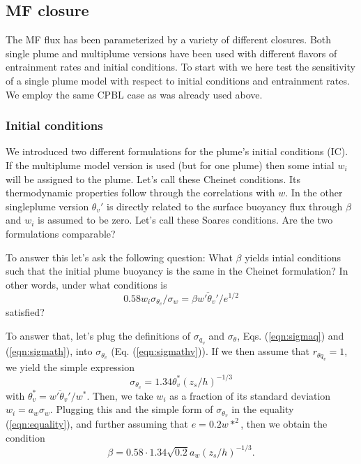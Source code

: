 \documentclass[dvipdfmx,a4paper,10pt]{article}
\begin{document}
\subsection{MF closure}

The MF flux has been parameterized by a variety of different closures. Both single plume and multiplume versions have been used with different flavors of entrainment rates and initial conditions. To start with we here test the sensitivity of a single plume model with respect to initial conditions and entrainment rates. We employ the same CPBL case \citep{nieuwstadt93,witek11} as was already used above.

\subsubsection{Initial conditions}

We introduced two different formulations for the plume's initial conditions (IC). If the multiplume model version is used (but for one plume) then some intial $w_i$ will be assigned to the plume. Let's call these Cheinet conditions. Its thermodynamic properties follow through the correlations with $w$. In the other singleplume version $\theta_v'$ is directly related to the surface buoyancy flux through $\beta$ and $w_i$ is assumed to be zero. Let's call these Soares conditions. Are the two formulations comparable?

To answer this let's ask the following question: What $\beta$ yields intial conditions such that the initial plume buoyancy is the same in the Cheinet formulation? In other words, under what conditions is 
\begin{equation}\label{eqn:equality}
 0.58 w_i\sigma_{\theta_v}/\sigma_w=\beta \overline{w'\theta_v'}/e^{1/2}
\end{equation}
satisfied?

To answer that, let's plug the definitions of $\sigma_{q_v}$ and $\sigma_{\theta}$, Eqs. (\ref{eqn:sigmaq}) and (\ref{eqn:sigmath}), into $\sigma_{\theta_v}$ (Eq. (\ref{eqn:sigmathv})). If we then assume that $r_{\theta q_v}=1$, we yield the simple expression
\begin{equation}
 \sigma_{\theta_v}=1.34 \theta_v^*(z_s/h)^{-1/3} 
\end{equation}
with $\theta_v^*=\overline{w'\theta_v'}/w^*$. Then, we take $w_i$ as a fraction of its standard deviation $w_i=a_w \sigma_w$. Plugging this and the simple form of $\sigma_{\theta_v}$ in the equality (\ref{eqn:equality}), and further assuming that $e=0.2w*^2$, then we obtain the condition 
\begin{equation}
 \beta = 0.58\cdot 1.34 \sqrt{0.2}a_w (z_s/h)^{-1/3}.
\end{equation}
\end{document}
